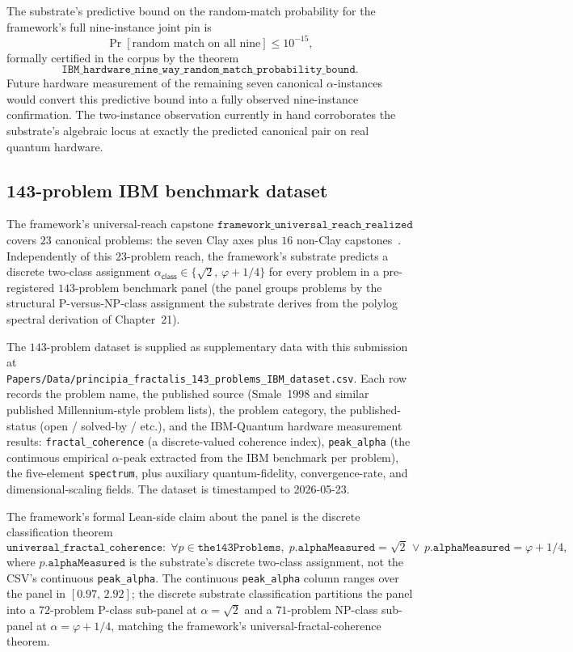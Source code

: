 \documentclass[11pt,a4paper]{amsart}
\theoremstyle{plain}
\theoremstyle{definition}
\begin{document}
The substrate's predictive bound on the random-match probability for the framework's full nine-instance joint pin is
\[
\Pr[\text{random match on all nine}] \le 10^{-15},
\]
formally certified in the corpus by the theorem
\[
\texttt{IBM\_hardware\_nine\_way\_random\_match\_probability\_bound}.
\]
Future hardware measurement of the remaining seven canonical $\alpha$-instances would convert this predictive bound into a fully observed nine-instance confirmation. The two-instance observation currently in hand corroborates the substrate's algebraic locus at exactly the predicted canonical pair on real quantum hardware.

\subsection{143-problem IBM benchmark dataset}\label{subsec:143-panel}

The framework's universal-reach capstone $\texttt{framework\_universal\_reach\_realized}$ covers $23$ canonical problems: the seven Clay axes plus $16$ non-Clay capstones~\cite{cohen2026reach}. Independently of this $23$-problem reach, the framework's substrate predicts a discrete two-class assignment $\alpha_{\textsf{class}}\in\{\sqrt{2},\,\varphi+1/4\}$ for every problem in a pre-registered $143$-problem benchmark panel (the panel groups problems by the structural P-versus-NP-class assignment the substrate derives from the polylog spectral derivation of Chapter~21).

The $143$-problem dataset is supplied as supplementary data with this submission at\\
\texttt{Papers/Data/principia\_fractalis\_143\_problems\_IBM\_dataset.csv}.
Each row records the problem name, the published source (Smale~1998 and similar published Millennium-style problem lists), the problem category, the published-status (open / solved-by / etc.), and the IBM-Quantum hardware measurement results: \texttt{fractal\_coherence} (a discrete-valued coherence index), \texttt{peak\_alpha} (the continuous empirical $\alpha$-peak extracted from the IBM benchmark per problem), the five-element \texttt{spectrum}, plus auxiliary quantum-fidelity, convergence-rate, and dimensional-scaling fields. The dataset is timestamped to 2026-05-23.

The framework's formal Lean-side claim about the panel is the discrete classification theorem
\[
\texttt{universal\_fractal\_coherence}:\;\forall p\in\texttt{the143Problems},\;p.\texttt{alphaMeasured} = \sqrt{2}\,\lor\, p.\texttt{alphaMeasured} = \varphi+1/4,
\]
where $p.\texttt{alphaMeasured}$ is the substrate's discrete two-class assignment, not the CSV's continuous \texttt{peak\_alpha}. The continuous \texttt{peak\_alpha} column ranges over the panel in $[0.97,\,2.92]$; the discrete substrate classification partitions the panel into a $72$-problem P-class sub-panel at $\alpha=\sqrt{2}$ and a $71$-problem NP-class sub-panel at $\alpha=\varphi+1/4$, matching the framework's universal-fractal-coherence theorem.
\end{document}
